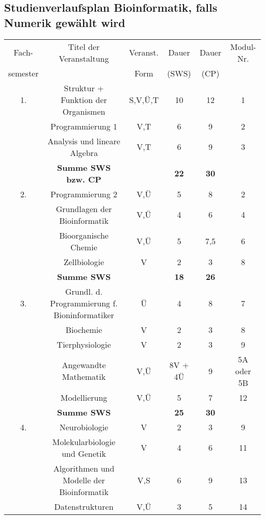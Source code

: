 
\begin{addmargin}[-5mm]{0cm}

\subsection{Studienverlaufsplan Bioinformatik, falls Numerik gewählt wird}

\begin{center}

\begin{tabular}{|c|cc|c|c|c|}
\hline Fach- & Titel der Veranstaltung & Veranst. & Dauer & Dauer & Modul-Nr. \\ 
 semester &  & Form & (SWS) & (CP) &  \\ 
\hline 1. & Struktur + Funktion der Organismen & S,V,Ü,T & 10 & 12 & 1 \\ 
\hline  & Programmierung 1 & V,T & 6 & 9 & 2 \\ 
\hline  & Analysis und lineare Algebra & V,T & 6 & 9 & 3 \\ 
\hline  & \textbf{Summe SWS bzw. CP} &  & \textbf{22} & \textbf{30} &  \\ 
\hline 2. & Programmierung 2 & V,Ü & 5 & 8 & 2 \\ 
\hline  & Grundlagen der Bioinformatik & V,Ü & 4 & 6 & 4 \\ 
\hline  & Bioorganische Chemie & V,Ü & 5 & 7,5 & 6 \\ 
\hline  & Zellbiologie & V & 2 & 3 & 8 \\ 
\hline  & \textbf{Summe SWS}&  & \textbf{18} & \textbf{26} &  \\ 
\hline 3. & Grundl. d. Programmierung f. Bioninformatiker & Ü & 4 & 8 & 7 \\ 
\hline  & Biochemie & V & 2 & 3 & 8 \\
        & Tierphysiologie & V & 2 & 3 & 9 \\ 
\hline  & Angewandte Mathematik & V,Ü & 8V + 4Ü & 9 & 5A oder 5B \\
\hline  & Modellierung & V,Ü & 5 & 7 & 12 \\ 
\hline  & \textbf{Summe SWS}&  & \textbf{25} & \textbf{30} &  \\
\hline 4. & Neurobiologie & V & 2 & 3 & 9 \\
\hline  & Molekularbiologie und Genetik & V & 4 & 6 & 11 \\ 
\hline  & Algorithmen und Modelle der Bioinformatik & V,S & 6 & 9 & 13 \\ 
\hline  & Datenstrukturen & V,Ü & 3 & 5 & 14 \\ 

\end{tabular}
\end{center}
\end{addmargin}
